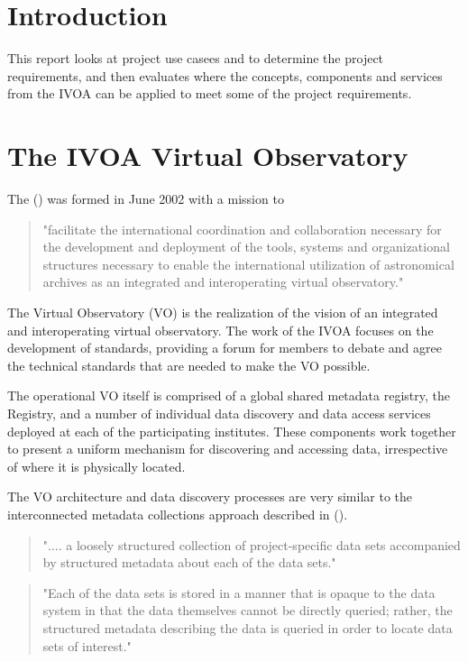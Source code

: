 \documentclass{article}
\begin{document}
\section{Introduction}

This report looks at \cite{trop} project use casees and to determine the project
requirements, and then evaluates where the concepts, components and services
from the IVOA can be applied to meet some of the \cite{trop} project requirements.

\section{The IVOA Virtual Observatory}

The  (\cite{ivoa}) was formed in June 2002 with a mission to
\begin{quote}
"facilitate the international coordination and collaboration
necessary for the development and deployment of the tools, systems and
organizational structures necessary to enable the international utilization of
astronomical archives as an integrated and interoperating virtual observatory."
\end{quote}

The Virtual Observatory (VO) is the realization of the \cite{ivoa} vision of
an integrated and interoperating virtual observatory.
The work of the IVOA focuses on the development of standards, providing a forum
for members to debate and agree the technical standards that are needed to make
the VO possible.

The operational VO itself is comprised of a global shared metadata registry,
the Registry, and a number of individual data discovery and data access services
deployed at each of the participating institutes.
These components work together to present a uniform mechanism for discovering
and accessing data, irrespective of where it is physically located.

The VO architecture and data discovery processes are very similar to the
interconnected metadata collections approach described in
 (\cite{jones-2006}).

\begin{quote}
".... a loosely structured collection of project-specific data sets
accompanied by structured metadata about each of the data sets."
\end{quote}

\begin{quote}
"Each of the data sets is stored in a manner that is opaque to the data system in
that the data themselves cannot be directly queried; rather, the structured
metadata describing the data is queried in order to locate data sets of
interest."
\end{quote}
\end{document}
